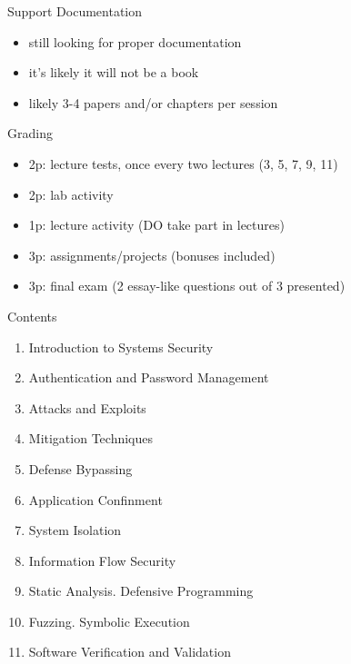 \documentclass{curs}
\begin{document}
\begin{frame}{Support Documentation}
  \begin{itemize}
    \item still looking for proper documentation
    \item it's likely it will not be a book
    \item likely 3-4 papers and/or chapters per session
  \end{itemize}
\end{frame}

\begin{frame}{Grading}
  \begin{itemize}
    \item 2p: lecture tests, once every two lectures (3, 5, 7, 9, 11)
    \item 2p: lab activity
    \item 1p: lecture activity (DO take part in lectures)
    \item 3p: assignments/projects (bonuses included)
    \item 3p: final exam (2 essay-like questions out of 3 presented)
  \end{itemize}
\end{frame}

\begin{frame}{Contents}
  \begin{enumerate}
    \pause \item Introduction to Systems Security
    \pause \item Authentication and Password Management
    \pause \item Attacks and Exploits
    \pause \item Mitigation Techniques
    \pause \item Defense Bypassing
    \pause \item Application Confinment
    \pause \item System Isolation
    \pause \item Information Flow Security
    \pause \item Static Analysis. Defensive Programming
    \pause \item Fuzzing. Symbolic Execution
    \pause \item Software Verification and Validation
  \end{enumerate}
\end{frame}
\end{document}
